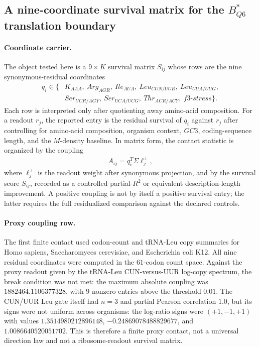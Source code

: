 \subsection{A nine-coordinate survival matrix for the $B^*_{Q6}$ translation boundary}
\label{sec:translation-survival-b-star-q6-survival-matrix}

\paragraph{Coordinate carrier.}
The object tested here is a $9\times K$ survival matrix $S_{ij}$ whose rows are the nine synonymous-residual coordinates
$$
\begin{aligned}
q_i \in \{&K_{AAA},\ Arg_{AGR},\ Ile_{AUA},\ Leu_{CUN/UUR},\ Leu_{UUA/UUG},\\
&Ser_{UCR/AGY},\ Ser_{UCA/UCG},\ Thr_{ACR/ACY},\ f3\text{-}stress\}.
\end{aligned}
$$
Each row is interpreted only after quotienting away amino-acid composition.  For a readout $r_j$, the reported entry is the residual survival of $q_i$ against $r_j$ after controlling for amino-acid composition, organism context, $GC3$, coding-sequence length, and the $M$-density baseline.  In matrix form, the contact statistic is organized by the coupling
$$
\begin{aligned}
A_{ij}=q_i^T\Sigma\ell_j^\perp,
\end{aligned}
$$
where $\ell_j^\perp$ is the readout weight after synonymous projection, and by the survival score $S_{ij}$, recorded as a controlled partial-$R^2$ or equivalent description-length improvement.  A positive coupling is not by itself a positive survival entry; the latter requires the full residualized comparison against the declared controls.

\paragraph{Proxy coupling row.}
The first finite contact used codon-count and tRNA-Leu copy summaries for Homo sapiens, Saccharomyces cerevisiae, and Escherichia coli K12.  All nine residual coordinates were computed in the $61$-codon count space.  Against the proxy readout given by the tRNA-Leu CUN-versus-UUR log-copy spectrum, the break condition was not met: the maximum absolute coupling was $1882464.1106377328$, with $9$ nonzero entries above the threshold $0.01$.  The CUN/UUR Leu gate itself had $n=3$ and partial Pearson correlation $1.0$, but its signs were not uniform across organisms: the log-ratio signs were $(+1,-1,+1)$ with values $1.3514980212896148$, $-0.24869078488829677$, and $1.0086640520051702$.  This is therefore a finite proxy contact, not a universal direction law and not a ribosome-readout survival matrix.

